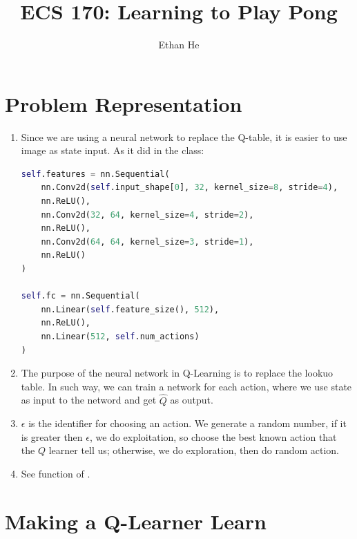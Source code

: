 \documentclass[12pt]{article}
\title{ECS 170: Learning to Play Pong}
\author{Ethan He}
\date{\vspace{-1cm}}
\newcommand{\1}{\mathds{1}}
\newcommand{\<}{\langle}
\renewcommand{\>}{\rangle}
\begin{document}
\maketitle

\section{Problem Representation}

\begin{enumerate}
    \item Since we are using a neural network to replace the Q-table,
        it is easier to use image as state input.
        As it did in the  class:
        \begin{lstlisting}[language=Python]
self.features = nn.Sequential(
    nn.Conv2d(self.input_shape[0], 32, kernel_size=8, stride=4),
    nn.ReLU(),
    nn.Conv2d(32, 64, kernel_size=4, stride=2),
    nn.ReLU(),
    nn.Conv2d(64, 64, kernel_size=3, stride=1),
    nn.ReLU()
)

self.fc = nn.Sequential(
    nn.Linear(self.feature_size(), 512),
    nn.ReLU(),
    nn.Linear(512, self.num_actions)
)
        \end{lstlisting}

    \item The purpose of the neural network in Q-Learning is to replace the lookuo table.
        In such way, we can train a network for each action,
        where we use state as input to the netword and get $\widehat{Q}$ as output.

    \item $\epsilon$ is the identifier for choosing an action.
        We generate a random number,
        if it is greater then $\epsilon$,
        we do exploitation, so choose the best known action that the $Q$ learner tell us;
        otherwise, we do exploration, then do random action.

    \item See function  of .
\end{enumerate}



\section{Making a Q-Learner Learn}
\end{document}
